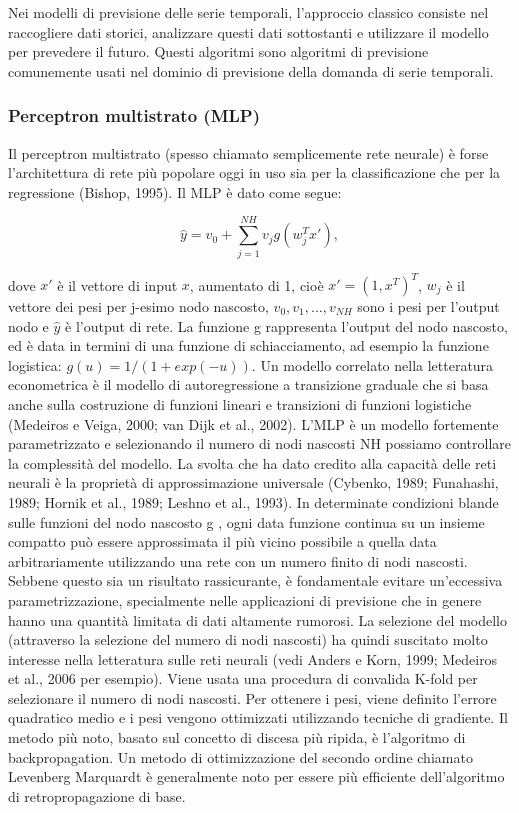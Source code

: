 \documentclass[12pt,a4paper]{report}
\begin{document}
Nei modelli di previsione delle serie temporali, l'approccio classico consiste nel raccogliere dati storici, analizzare questi dati sottostanti e utilizzare il modello per prevedere il futuro. Questi algoritmi sono algoritmi di previsione comunemente usati nel dominio di previsione della domanda di serie temporali.

\subsubsection{Perceptron multistrato (MLP)}
Il perceptron multistrato (spesso chiamato semplicemente rete neurale) è forse l'architettura di rete più popolare oggi in uso sia per la classificazione che per la regressione (Bishop, 1995). Il MLP è dato come segue:

\begin{equation}
{\displaystyle \hat{y} = v_0 + \sum\limits_{j=1}^{NH} v_jg(w_{j}^{T}x')} ,
\end{equation}

dove $x'$ è il vettore di input $x$, aumentato di 1, cioè $ x' = (1, x^T )^T  $, $w_j$  è il vettore dei pesi per j-esimo nodo nascosto, $v_0, v_1, ..., v_{NH}$ sono i pesi per l'output nodo e $\hat{y}$ è l'output di rete. La funzione g rappresenta l'output del nodo nascosto, ed è data in termini di una funzione di schiacciamento, ad esempio la funzione logistica:
$g(u) = 1/(1 + exp(-u))$. 
Un modello correlato nella letteratura econometrica è il modello di autoregressione a transizione graduale che si basa anche sulla costruzione di funzioni lineari e transizioni di funzioni logistiche (Medeiros e Veiga, 2000; van Dijk et al., 2002).
L'MLP è un modello fortemente parametrizzato e selezionando il numero di nodi nascosti NH possiamo controllare la complessità del modello. La svolta che ha dato credito alla capacità delle reti neurali è la proprietà di approssimazione universale (Cybenko, 1989; Funahashi, 1989; Hornik et al., 1989; Leshno et al., 1993). In determinate condizioni blande sulle funzioni del nodo nascosto g , ogni data funzione continua su un insieme compatto può essere approssimata il più vicino possibile a quella data arbitrariamente utilizzando una rete con un numero finito di nodi nascosti. Sebbene questo sia un risultato rassicurante, è fondamentale evitare un'eccessiva parametrizzazione, specialmente nelle applicazioni di previsione che in genere hanno una quantità limitata di dati altamente rumorosi. La selezione del modello (attraverso la selezione del numero di nodi nascosti) ha quindi suscitato molto interesse nella letteratura sulle reti neurali (vedi Anders e Korn, 1999; Medeiros et al., 2006 per esempio). Viene usata una procedura di convalida K-fold per selezionare il numero di nodi nascosti.
Per ottenere i pesi, viene definito l'errore quadratico medio e i pesi vengono ottimizzati utilizzando tecniche di gradiente. Il metodo più noto, basato sul concetto di discesa più ripida, è l'algoritmo di backpropagation. Un metodo di ottimizzazione del secondo ordine chiamato Levenberg Marquardt è generalmente noto per essere più efficiente dell'algoritmo di retropropagazione di base.
\end{document}
